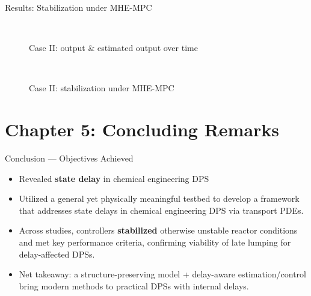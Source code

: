 \documentclass[8pt]{beamer}
\begin{document}
\begin{frame}{Results: Stabilization under MHE-MPC}

\small
\begin{figure}
    \centering
    \\[-2em]
    \caption{Case II: output \& estimated output over time}
\end{figure}

\begin{figure}
    \centering
    \\[-1.5em]
    \caption{Case II: stabilization under MHE-MPC}
\end{figure}


\end{frame}







\section{Chapter 5: Concluding Remarks}


\begin{frame}[t]{Conclusion — Objectives Achieved}
\begin{itemize}
  \item Revealed \textbf{state delay} in chemical engineering DPS
  \item Utilized a general yet physically meaningful testbed to develop a framework that addresses state delays in chemical engineering DPS via transport PDEs.
  \item Across studies, controllers \textbf{stabilized} otherwise unstable reactor conditions and met key performance criteria, confirming viability of late lumping for delay-affected DPSs.
  \item Net takeaway: a structure-preserving model + delay-aware estimation/control bring modern methods to practical DPSs with internal delays.
\end{itemize}
\end{frame}
\end{document}
